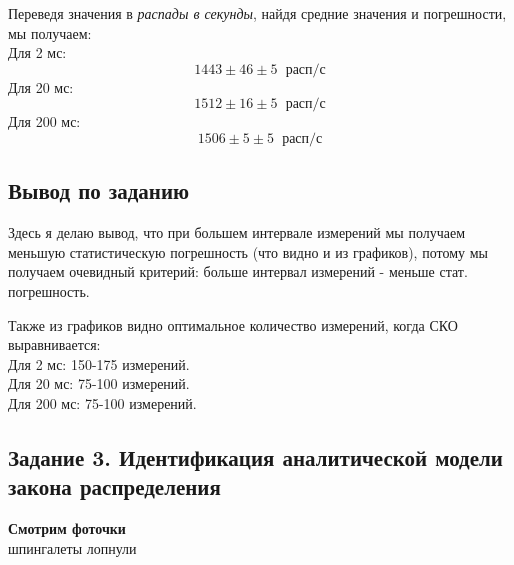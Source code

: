\documentclass[a4paper,12pt]{article}
\begin{document}
Переведя значения в \textit{распады в секунды}, найдя средние значения и погрешности, мы получаем:\\
Для 2 мс:
\begin{equation}
    1443 \pm 46 \pm 5 \hspace{7pt} расп/с
\end{equation}
Для 20 мс:
\begin{equation}
    1512 \pm 16 \pm 5 \hspace{7pt} расп/с
\end{equation}
Для 200 мс:
\begin{equation}
    1506 \pm 5 \pm 5 \hspace{7pt} расп/с
\end{equation}

\subsection{Вывод по заданию}
\hspace{\parindent}Здесь я делаю вывод, что при большем интервале измерений мы получаем меньшую статистическую погрешность (что видно и из графиков), потому мы получаем очевидный критерий: больше интервал измерений - меньше стат. погрешность.

Также из графиков видно оптимальное количество измерений, когда СКО выравнивается:\\
Для 2 мс: 150-175 измерений.\\
Для 20 мс: 75-100 измерений.\\
Для 200 мс: 75-100 измерений.

\clearpage
\subsection{Задание 3. Идентификация аналитической модели
закона распределения}
\centering\Large \textbf{Смотрим фоточки}\\
\small шпингалеты лопнули
\end{document}
